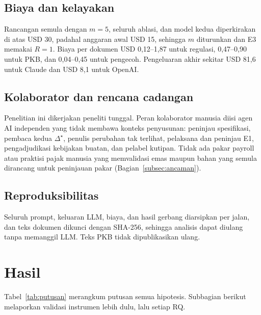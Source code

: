 \documentclass[journal,a4paper]{IEEEtran}
\makeatletter
\DeclareRobustCommand{\en}[1]{{\usefont{\f@encoding}{\f@family}{\f@series}{it}#1\/}}
\newcommand{\emas}{\star}
\makeatother
\begin{document}
\subsection{Biaya dan kelayakan}
Rancangan semula dengan $m = 5$, seluruh ablasi, dan model kedua diperkirakan di atas USD 30, padahal anggaran awal USD 15, sehingga $m$ diturunkan dan E3 memakai $R = 1$. Biaya per dokumen USD 0,12--1,87 untuk regulasi, 0,47--0,90 untuk PKB, dan 0,04--0,45 untuk pengecoh. Pengeluaran akhir sekitar USD 81,6 untuk Claude dan USD 8,1 untuk OpenAI.

\subsection{Kolaborator dan rencana cadangan}
Penelitian ini dikerjakan peneliti tunggal. Peran kolaborator manusia diisi agen AI independen yang tidak membawa konteks penyusunan: peninjau spesifikasi, pembaca kedua $\Delta^{\emas}$, penulis perubahan tak terlihat, pelaksana dan peninjau E1, pengadjudikasi kebijakan buatan, dan pelabel kutipan. Tidak ada pakar \en{payroll} atau praktisi pajak manusia yang memvalidasi emas maupun bahan yang semula dirancang untuk peninjauan pakar (Bagian~\ref{subsec:ancaman}).

\subsection{Reproduksibilitas}
Seluruh \en{prompt}, keluaran LLM, biaya, dan hasil gerbang diarsipkan per jalan, dan teks dokumen dikunci dengan SHA-256, sehingga analisis dapat diulang tanpa memanggil LLM. Teks PKB tidak dipublikasikan ulang.

\section{Hasil}
\label{sec:hasil}
Tabel~\ref{tab:putusan} merangkum putusan semua hipotesis. Subbagian berikut melaporkan validasi instrumen lebih dulu, lalu setiap RQ.
\end{document}
